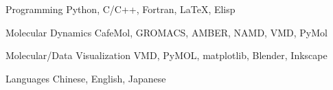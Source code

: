 

\begin{cvskills}

  \cvskill
    {Programming} %
    {Python, C/C++, Fortran, LaTeX, Elisp} %

  \cvskill
    {Molecular Dynamics} %
    {CafeMol, GROMACS, AMBER, NAMD, VMD, PyMol} %

  \cvskill
    {Molecular/Data Visualization} %
    {VMD, PyMOL, matplotlib, Blender, Inkscape} %

  \cvskill
    {Languages} %
    {Chinese, English, Japanese} %

\end{cvskills}
